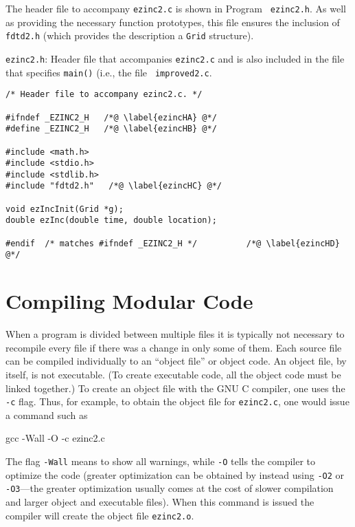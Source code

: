 The header file to accompany {\tt ezinc2.c} is shown in Program {\tt
  ezinc2.h}.  As well as providing the necessary function prototypes,
this file ensures the inclusion of {\tt fdtd2.h} (which provides the
description a {\tt Grid} structure).

\begin{program}
{\tt ezinc2.h}: Header file that accompanies {\tt ezinc2.c} and is also
included in the file that specifies {\tt main()} (i.e., the file {\tt
  improved2.c}.
\label{pro:ezincH} 
\codemiddle
\begin{lstlisting}
/* Header file to accompany ezinc2.c. */

#ifndef _EZINC2_H   /*@ \label{ezincHA} @*/
#define _EZINC2_H   /*@ \label{ezincHB} @*/

#include <math.h>
#include <stdio.h>
#include <stdlib.h>
#include "fdtd2.h"   /*@ \label{ezincHC} @*/

void ezIncInit(Grid *g);
double ezInc(double time, double location);

#endif  /* matches #ifndef _EZINC2_H */          /*@ \label{ezincHD} @*/
\end{lstlisting}
\end{program}

\section{Compiling Modular Code \label{sec:compMultiFile}}

When a program is divided between multiple files it is typically not
necessary to recompile every file if there was a change in only some
of them.  Each source file can be compiled individually to an ``object
file'' or object code.  An object file, by itself, is not executable.
(To create executable code, all the object code must be linked
together.)  To create an object file with the GNU C compiler, one uses
the {\tt -c} flag.  Thus, for example, to obtain the object file for
{\tt ezinc2.c}, one would issue a command such as 
\begin{code}
  gcc -Wall -O -c ezinc2.c
\end{code}
The flag {\tt -Wall} means to show all warnings, while {\tt -O} tells
the compiler to optimize the code (greater optimization can be
obtained by instead using {\tt -O2} or {\tt -O3}---the greater
optimization usually comes at the cost of slower compilation and larger
object and executable files).  When this command is issued the
compiler will create the object file {\tt ezinc2.o}.

